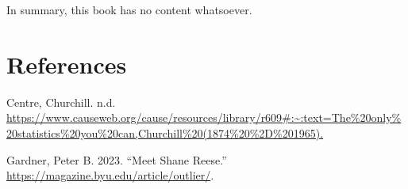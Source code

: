\documentclass[
  letterpaper,
  DIV=11,
  numbers=noendperiod]{scrreprt}
\newlength{\cslhangindent}
\newlength{\cslentryspacingunit} %
\newenvironment{CSLReferences}[2] %
 {%
  \setlength{\parindent}{0pt}
  \ifodd #1
  \let\oldpar\par
  \def\par{\hangindent=\cslhangindent\oldpar}
  \fi
  \setlength{\parskip}{#2\cslentryspacingunit}
 }%
 {}
\begin{document}
In summary, this book has no content whatsoever.

\hypertarget{references}{%
\chapter*{References}\label{references}}


\hypertarget{refs}{}
\begin{CSLReferences}{1}{0}
\leavevmode{}%
Centre, Churchill. n.d.
\url{https://www.causeweb.org/cause/resources/library/r609\#:~:text=The\%20only\%20statistics\%20you\%20can,Churchill\%20(1874\%20\%2D\%201965).}

\leavevmode{}%
Gardner, Peter B. 2023. {``Meet Shane Reese.''}
\url{https://magazine.byu.edu/article/outlier/}.

\end{CSLReferences}
\end{document}
